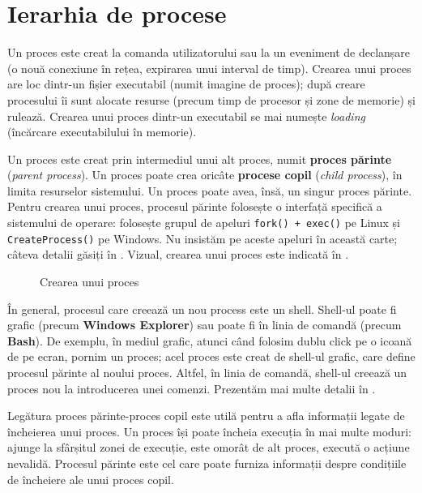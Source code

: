 \section{Ierarhia de procese}
\label{sec:procese-ierarhie}

Un proces este creat la comanda utilizatorului sau la un eveniment de declanșare
(o nouă conexiune în rețea, expirarea unui interval de timp). Crearea unui
proces are loc dintr-un fișier executabil (numit imagine de proces); după creare
procesului îi sunt alocate resurse (precum timp de procesor și zone de memorie)
și rulează. Crearea unui proces dintr-un executabil se mai numește
\textit{loading} (încărcare executabilului în memorie).

Un proces este creat prin intermediul unui alt proces, numit \textbf{proces părinte} (\textit{parent process}). Un
proces poate crea oricâte \textbf{procese copil} (\textit{child process}), în limita resurselor sistemului. Un
proces poate avea, însă, un singur proces părinte. Pentru crearea unui proces,
procesul părinte folosește o interfață specifică a sistemului de operare:
folosește grupul de apeluri \texttt{fork() + exec()} pe Linux și \texttt{CreateProcess()} pe
Windows. Nu insistăm pe aceste apeluri în această carte; câteva detalii găsiți
în . Vizual,
crearea unui proces este indicată în .

\begin{figure}[!htbp]
	\centering
	\def\svgwidth{0.8\textwidth}
	
	\caption{Crearea unui proces}
	\label{fig:process-create}
\end{figure}

În general, procesul care creează un nou process este un shell. Shell-ul poate
fi grafic (precum \textbf{Windows Explorer}) sau poate fi în linia de comandă (precum
\textbf{Bash}). De exemplu, în mediul grafic, atunci când folosim dublu click pe o icoană
de pe ecran, pornim un proces; acel proces este creat de shell-ul grafic, care
define procesul părinte al noului proces. Altfel, în linia de comandă, shell-ul
creează un proces nou la introducerea unei comenzi. Prezentăm mai multe detalii
în .

Legătura proces părinte-proces copil este utilă pentru a afla informații legate
de încheierea unui proces. Un proces își poate încheia execuția în mai multe
moduri: ajunge la sfârșitul zonei de execuție, este omorât de alt proces,
execută o acțiune nevalidă. Procesul părinte este cel care poate furniza
informații despre condițiile de încheiere ale unui proces copil.

